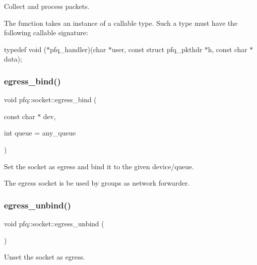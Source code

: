 Collect and process packets. 

The function takes an instance of a callable type. Such a type must have the following callable signature\+:

typedef void ($\ast$pfq\+\_\+handler)(char $\ast$user, const struct pfq\+\_\+pkthdr $\ast$h, const char $\ast$data); \mbox{\label{classpfq_1_1socket_a2c96741054ea764f5d8c31295ef5df29}} 
\subsubsection{\texorpdfstring{egress\+\_\+bind()}{egress\_bind()}}
{\footnotesize\ttfamily void pfq\+::socket\+::egress\+\_\+bind (\begin{DoxyParamCaption}\item[{const char $\ast$}]{dev,  }\item[{int}]{queue = {\ttfamily any\+\_\+queue} }\end{DoxyParamCaption})\hspace{0.3cm}{\ttfamily [inline]}}



Set the socket as egress and bind it to the given device/queue. 

The egress socket is be used by groups as network forwarder. \mbox{\label{classpfq_1_1socket_ae80718e8f26cdaed3fd05bfde6d835e0}} 
\subsubsection{\texorpdfstring{egress\+\_\+unbind()}{egress\_unbind()}}
{\footnotesize\ttfamily void pfq\+::socket\+::egress\+\_\+unbind (\begin{DoxyParamCaption}{ }\end{DoxyParamCaption})\hspace{0.3cm}{\ttfamily [inline]}}



Unset the socket as egress. 

\mbox{\label{classpfq_1_1socket_a5b25af762946405695f4192b08c04146}} 
